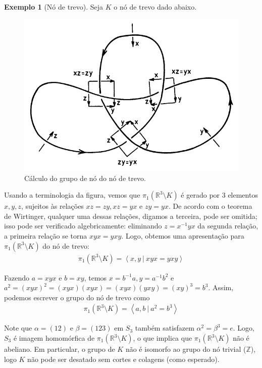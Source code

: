 \documentclass[a4paper,portuguese,11pt,twoside, leqno]{book}
\theoremstyle{definition}
\newtheorem{example}{Exemplo}[section]
\begin{document}
	\begin{example}[Nó de trevo]
		Seja $K$ o nó de trevo dado abaixo.
		\begin{figure}[H]
			\begin{center}
				\includegraphics[width=12cm]{Images/gruponotrevo.png}
			\end{center}\caption{Cálculo do grupo de nó do nó de trevo.}
			\label{grupo no de trevo}
		\end{figure}
		\par\vspace{0.3cm} Usando a terminologia da figura, vemos que $\pi_1(\mathbb{R}^3\setminus K)$ é gerado por $3$ elementos $x, y, z$, sujeitos às relações $xz = zy, xz = yx$ e $zy = yx$. De acordo com o teorema de Wirtinger, qualquer uma dessas relações, digamos a terceira, pode ser omitida; isso pode ser verificado algebricamente: eliminando $z = x^{-1}yx$ da segunda relação, a primeira relação se torna $xyx = yxy$. Logo, obtemos uma apresentação para $\pi_1(\mathbb{R}^3\setminus K)$ do nó de trevo:
		\begin{align*}
		\pi_1(\mathbb{R}^3\setminus K) = \left< x,y \ | \ xyx = yxy \right>
		\end{align*}
		\par\vspace{0.3cm} Fazendo $a = xyx$ e $b = xy$, temos $x = b^{-1}a, y = a^{-1}b^2$ e $a^2 = (xyx)^2 = (xyx)(xyx) = (xyx)(yxy) = (xy)^3 = b^3$. Assim, podemos escrever o grupo do nó de trevo como
		\begin{align*}
		\pi_1(\mathbb{R}^3\setminus K) = \left< a,b \ | \ a^2 = b^3 \right>
		\end{align*}
		\par\vspace{0.3cm} Note que $\alpha = (12)$ e $\beta = (123)$ em $S_3$ também satisfazem $\alpha^2 = \beta^3 = e$. Logo, $S_3$ é imagem homomórfica de $\pi_1(\mathbb{R}^3\setminus K)$, o que implica que $\pi_1(\mathbb{R}^3\setminus K)$ não é abeliano. Em particular, o grupo de $K$ não é isomorfo ao grupo do nó trivial ($\mathbb{Z}$), logo $K$ não pode ser desatado sem cortes e colagens (como esperado).
	\end{example}
\end{document}
